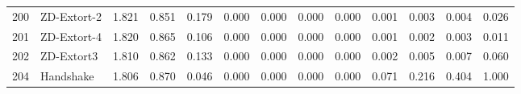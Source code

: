 \begin{tabular}{rlrrrrrrrrrrr}
  200 &            ZD-Extort-2 &           1.821 &       0.851 &    0.179 &             0.000 &         0.000 &           0.000 &            0.000 &          0.001 &         0.003 &            0.004 &         0.026 \\
  201 &            ZD-Extort-4 &           1.820 &       0.865 &    0.106 &             0.000 &         0.000 &           0.000 &            0.000 &          0.001 &         0.002 &            0.003 &         0.011 \\
  202 &             ZD-Extort3 &           1.810 &       0.862 &    0.133 &             0.000 &         0.000 &           0.000 &            0.000 &          0.002 &         0.005 &            0.007 &         0.060 \\
  204 &              Handshake &           1.806 &       0.870 &    0.046 &             0.000 &         0.000 &           0.000 &            0.000 &          0.071 &         0.216 &            0.404 &         1.000 \\
\bottomrule
\end{tabular}
